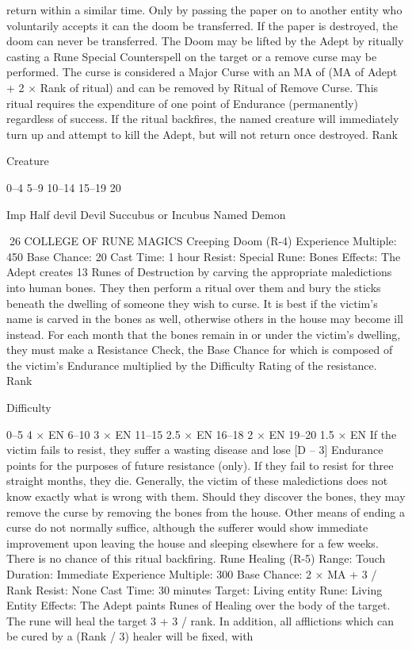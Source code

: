 \documentclass[a4paper]{article}
\begin{document}
\begin{multicols}{3}
return within a similar time.
Only by passing the paper on to another entity who
voluntarily accepts it can the doom be transferred.
If the paper is destroyed, the doom can never be
transferred. The Doom may be lifted by the Adept
by ritually casting a Rune Special Counterspell on
the target or a remove curse may be performed.
The curse is considered a Major Curse with an MA
of (MA of Adept + 2 × Rank of ritual) and can be
removed by Ritual of Remove Curse.
This ritual requires the expenditure of one point of
Endurance (permanently) regardless of success. If
the ritual backfires, the named creature will immediately turn up and attempt to kill the Adept, but
will not return once destroyed.
Rank

Creature

0–4
5–9
10–14
15–19
20

Imp
Half devil
Devil
Succubus or Incubus
Named Demon

26 COLLEGE OF RUNE MAGICS
Creeping Doom (R-4)
Experience Multiple: 450
Base Chance: 20%
Cast Time: 1 hour
Resist: Special
Rune: Bones
Effects: The Adept creates 13 Runes of Destruction
by carving the appropriate maledictions into human
bones. They then perform a ritual over them and
bury the sticks beneath the dwelling of someone
they wish to curse. It is best if the victim’s name is
carved in the bones as well, otherwise others in the
house may become ill instead. For each month that
the bones remain in or under the victim’s dwelling,
they must make a Resistance Check, the Base
Chance for which is composed of the victim’s
Endurance multiplied by the Difficulty Rating of
the resistance.
Rank

Difficulty

0–5
4 × EN
6–10
3 × EN
11–15 2.5 × EN
16–18 2 × EN
19–20 1.5 × EN
If the victim fails to resist, they suffer a wasting
disease and lose [D – 3] Endurance points for the
purposes of future resistance (only). If they fail to
resist for three straight months, they die.
Generally, the victim of these maledictions does
not know exactly what is wrong with them. Should
they discover the bones, they may remove the
curse by removing the bones from the house. Other
means of ending a curse do not normally suffice,
although the sufferer would show immediate improvement upon leaving the house and sleeping
elsewhere for a few weeks. There is no chance of
this ritual backfiring.
Rune Healing (R-5)
Range: Touch
Duration: Immediate
Experience Multiple: 300
Base Chance: 2 × MA + 3 / Rank
Resist: None
Cast Time: 30 minutes
Target: Living entity
Rune: Living Entity
Effects: The Adept paints Runes of Healing over
the body of the target. The rune will heal the target
3 + 3 / rank. In addition, all afflictions which can
be cured by a (Rank / 3) healer will be fixed, with


\end{multicols}
\end{document}
